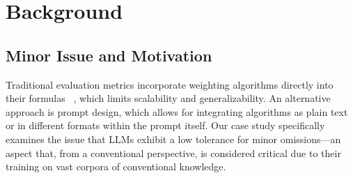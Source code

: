 \section{Background}\label{sec:Background}
\vspace{-2mm}
\subsection{Minor Issue and Motivation}

Traditional evaluation metrics incorporate weighting algorithms directly into their formulas ~\cite{feng2023joint,lin2004rouge}, which limits scalability and generalizability. An alternative approach is prompt design, which allows for integrating algorithms as plain text or in different formats within the prompt itself. Our case study specifically examines the issue that LLMs exhibit a low tolerance for minor omissions—an aspect that, from a conventional perspective, is considered critical due to their training on vast corpora of conventional knowledge. 






